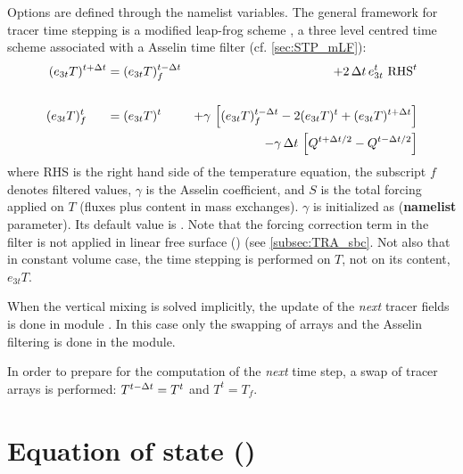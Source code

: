 \documentclass[../main/NEMO_manual]{subfiles}
\begin{document}
Options are defined through the   namelist variables.
The general framework for tracer time stepping is a modified leap-frog scheme \citep{Leclair_Madec_OM09},
\ie a three level centred time scheme associated with a Asselin time filter (cf. \autoref{sec:STP_mLF}):
\begin{equation}
  \label{eq:tra_nxt}
  \begin{aligned}
    (e_{3t}T)^{t+\Delta t} &= (e_{3t}T)_f^{t-\Delta t} &+ 2 \, \Delta t  \,e_{3t}^t\ \text{RHS}^t &	\\ \\
    (e_{3t}T)_f^t  \;\ \quad &= (e_{3t}T)^t \;\quad
    &+\gamma \,\left[ {(e_{3t}T)_f^{t-\Delta t} -2(e_{3t}T)^t+(e_{3t}T)^{t+\Delta t}} \right] &  \\
    & &- \gamma\,\Delta t \, \left[ Q^{t+\Delta t/2} -  Q^{t-\Delta t/2} \right]  &
  \end{aligned}
\end{equation} 
where RHS is the right hand side of the temperature equation, the subscript $f$ denotes filtered values,
$\gamma$ is the Asselin coefficient, and $S$ is the total forcing applied on $T$
(\ie fluxes plus content in mass exchanges).
$\gamma$ is initialized as  (\textbf{namelist} parameter).
Its default value is .
Note that the forcing correction term in the filter is not applied in linear free surface
() (see \autoref{subsec:TRA_sbc}.
Not also that in constant volume case, the time stepping is performed on $T$, not on its content, $e_{3t}T$.

When the vertical mixing is solved implicitly,
the update of the \textit{next} tracer fields is done in module .
In this case only the swapping of arrays and the Asselin filtering is done in the  module.

In order to prepare for the computation of the \textit{next} time step, a swap of tracer arrays is performed:
$T^{t-\Delta t} = T^t$ and $T^t = T_f$. 

\section{Equation of state (\protect{}) }
\label{sec:TRA_eosbn2}
\end{document}
